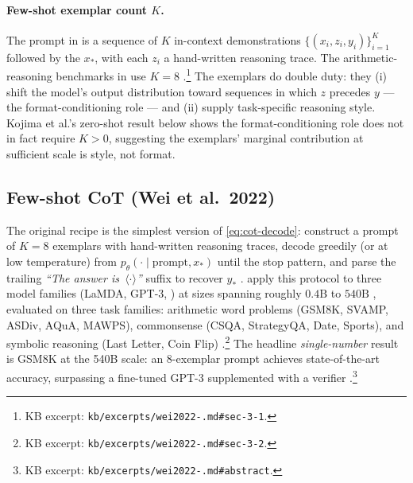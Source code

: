 \paragraph{Few-shot exemplar count $K$.} The  prompt in
\citet{wei2022-cot} is a sequence of $K$ in-context demonstrations
$\{(x_i, z_i, y_i)\}_{i=1}^K$ followed by the  $x_*$, with each
$z_i$ a hand-written reasoning trace. The arithmetic-reasoning
benchmarks in \citet{wei2022-cot} use $K = 8$
\citep[\S 3.1]{wei2022-cot}.\footnote{KB excerpt:
\texttt{kb/excerpts/wei2022-.md\#sec-3-1}.} The exemplars do double
duty: they (i) shift the model's output distribution toward sequences
in which $z$ precedes $y$ — the format-conditioning role — and
(ii) supply task-specific reasoning style. Kojima et al.'s zero-shot
result below shows the format-conditioning role does not in fact
require $K > 0$, suggesting the exemplars' marginal contribution at
sufficient scale is style, not format.

\subsection{Few-shot CoT (Wei et al.\ 2022)}
\label{sec:cot-fewshot}

The original recipe is the simplest version of \cref{eq:cot-decode}:
construct a prompt of $K = 8$ exemplars with hand-written reasoning
traces, decode greedily (or at low temperature) from $p_\theta(\cdot
\mid \text{prompt}, x_*)$ until the stop pattern, and parse the
trailing \emph{``The answer is~$\langle\cdot\rangle$''} suffix to
recover $y_*$ \citep[\S 3.1]{wei2022-cot}. \citet{wei2022-cot} apply
this protocol to three model families (LaMDA, GPT-3, ) at sizes
spanning roughly $0.4\text{B}$ to $540\text{B}$ , evaluated
on three task families: arithmetic word problems (GSM8K, SVAMP, ASDiv,
AQuA, MAWPS), commonsense (CSQA, StrategyQA, Date, Sports), and
symbolic reasoning (Last Letter, Coin Flip)
\citep[\S 3.2]{wei2022-cot}.\footnote{KB excerpt:
\texttt{kb/excerpts/wei2022-.md\#sec-3-2}.} The headline
\emph{single-number} result is GSM8K at the 540B scale: an 8-exemplar
 prompt achieves state-of-the-art accuracy, surpassing a fine-tuned
GPT-3 supplemented with a verifier
\citep[abstract]{wei2022-cot}.\footnote{KB excerpt:
\texttt{kb/excerpts/wei2022-.md\#abstract}.}

